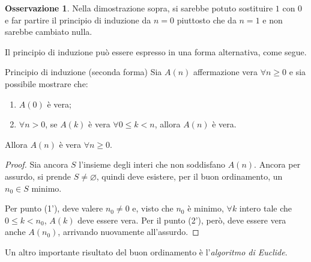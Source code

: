 \documentclass[11pt, a4paper]{scrartcl}
\theoremstyle{definition}
\numberwithin{esempio}{section}
\theoremstyle{definition}
\newtheorem{obs}{Osservazione}
\numberwithin{obs}{section}
\numberwithin{nota}{section}
\numberwithin{equation}{subsection}
\begin{document}
\begin{obs}
	Nella dimostrazione sopra, si sarebbe potuto sostituire $1$ con $0$ e far partire il principio di induzione da $n=0$ piuttosto che da $n=1$ e non sarebbe cambiato nulla.
\end{obs}
\noindent Il principio di induzione pu\`o essere espresso in una forma alternativa, come segue.
\begin{teorema}
	{Principio di induzione (seconda forma)}{}
	Sia $A(n)$ affermazione vera $\forall n\ge 0$ e sia possibile mostrare che:
	\begin{enumerate}[(1').]
		\item $A(0)$ \`e vera;
		\item $\forall n > 0$, se $A(k)$ \`e vera $\forall 0\le k < n$, allora $A(n)$ \`e vera.
	\end{enumerate}
	Allora $A(n)$ \`e vera $\forall n\ge 0$.
	\begin{proof}
	Sia ancora $S$ l'insieme degli interi che non soddisfano $A(n)$. 
	Ancora per assurdo, si prende $S\neq \varnothing$, quindi deve esistere, per il buon ordinamento, un $n_0 \in S$ minimo.

	Per punto (1'), deve valere $n_0 \neq 0$ e, visto che $n_0$ \`e minimo, $\forall k$ intero tale che $0\le k< n_0$, $A(k)$ deve essere vera. 
	Per il punto (2'), per\`o, deve essere vera anche $A(n_0)$, arrivando nuovamente all'assurdo.
	\end{proof}
\end{teorema}
\noindent Un altro importante risultato del buon ordinamento \`e l'\textit{algoritmo di Euclide}.
\end{document}
